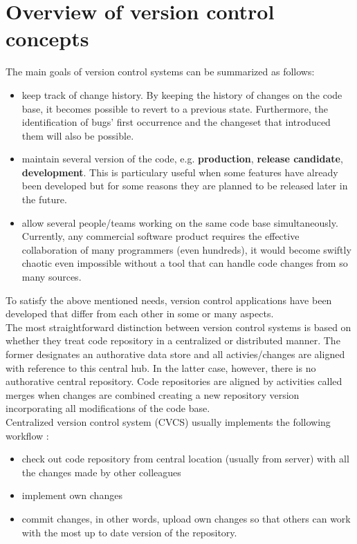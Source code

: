 \section{Overview of version control concepts} \label{overview-version-control}
The main goals of version control systems can be summarized as follows:
\begin{itemize}
    \item keep track of change history. By keeping the history of changes on the code base, it becomes possible to revert
    to a previous state. Furthermore, the identification of bugs' first occurrence and the changeset that introduced them
    will also be possible.
    \item maintain several version of the code, e.g. \textbf{production}, \textbf{release candidate}, \textbf{development}. 
    This is particulary useful when some features have already been developed but for some reasons they are planned to be 
    released later in the future.
    \item allow several people/teams working on the same code base simultaneously. Currently, any commercial software
    product requires the effective collaboration of many programmers (even hundreds), it would become swiftly chaotic
    even impossible without a tool that can handle code changes from so many sources.
\end{itemize}
To satisfy the above mentioned needs, version control applications have been developed that differ from each other in
some or many aspects. \\
The most straightforward distinction between version control systems is based on whether they treat code repository in 
a centralized or distributed manner. The former designates an authorative data store and all activies/changes are 
aligned with reference to this central hub. In the latter case, however, there is no authorative central repository.
Code repositories are aligned by activities called merges when changes are combined creating a new repository version 
incorporating all modifications of the code base. \\
Centralized version control system (CVCS) usually implements the following workflow \cite{atlassian-vcs}:
\begin{itemize}
    \item check out code repository from central location (usually from server) with all the changes made by other
    colleagues
    \item implement own changes
    \item commit changes, in other words, upload own changes so that others can work with the most up to date version of
    the repository.
\end{itemize}
